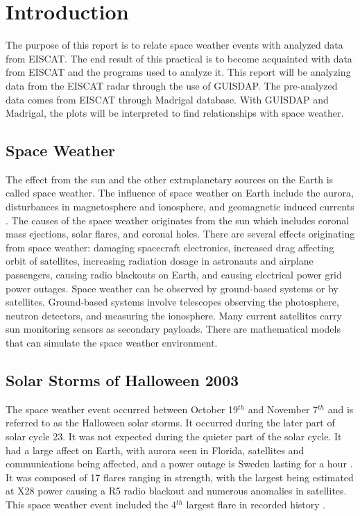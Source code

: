 
\section{Introduction}
The purpose of this report is to relate space weather events with analyzed data from EISCAT.
The end result of this practical is to become acquainted with data from EISCAT and the programs used to analyze it.
This report will be analyzing data from the EISCAT radar through the use of GUISDAP. 
The pre-analyzed data comes from EISCAT through Madrigal database.
With GUISDAP and Madrigal, the plots will be interpreted to find relationships with space weather. 

\subsection{Space Weather}
The effect from the sun and the other extraplanetary sources on the Earth is called space weather. 
The influence of space weather on Earth include the aurora, disturbances in magnetosphere and ionosphere, and geomagnetic induced currents \cite{I_NOAA_2}. 
The causes of the space weather originates from the sun which includes coronal mass ejections, solar flares, and coronal holes.
There are several effects originating from space weather: damaging spacecraft electronics, increased drag affecting orbit of satellites, increasing radiation dosage in astronauts and airplane passengers, causing radio blackouts on Earth, and causing electrical power grid power outages.
Space weather can be observed by ground-based systems or by satellites. Ground-based systems involve telescopes observing the photosphere, neutron detectors, and measuring the ionosphere.
Many current satellites carry sun monitoring sensors as secondary payloads.
There are mathematical models that can simulate the space weather environment.

\subsection{Solar Storms of Halloween 2003}
The space weather event  occurred between October 19$^{th}$ and November 7$^{th}$ and is referred to as the Halloween solar storms. 
It occurred during the later part of solar cycle 23. It was not expected during the quieter part of the solar cycle.
It had a large affect on Earth, with aurora seen in Florida, satellites and communications being affected, and a power outage is Sweden lasting for a hour \cite{I_NASA_1}. 
It was composed of 17 flares ranging in strength, with the largest being estimated at X28 power causing a R5 radio blackout and numerous anomalies in satellites. 
This space weather event included the 4$^{th}$ largest flare in recorded history \cite{I_NOAA}.
